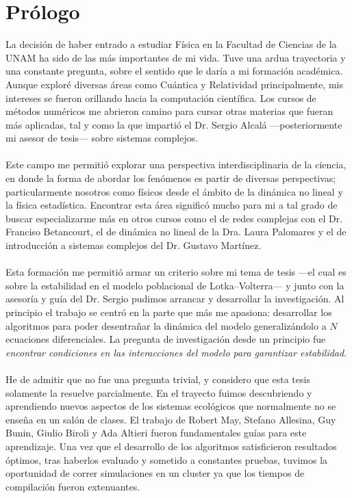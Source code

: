 \chapter{Prólogo}

\setlength{\parindent}{0cm} La decisión de haber entrado a estudiar Física en la Facultad de Ciencias de la UNAM ha sido de las más importantes de mi vida. Tuve una ardua trayectoria y una constante pregunta, sobre el sentido que le daría a mi formación académica. Aunque exploré diversas áreas como Cuántica y Relatividad principalmente, mis intereses se fueron orillando hacia la computación científica. Los cursos de métodos numéricos me abrieron camino para cursar otras materias que fueran más aplicadas, tal y como la que impartió el Dr. Sergio Alcalá ---posteriormente mi asesor de tesis--- sobre sistemas complejos.\\
\\
Este campo me permitió explorar una perspectiva interdisciplinaria de la ciencia, en donde la forma de abordar los fenómenos es partir de diversas perspectivas; particularmente nosotros como físicos desde el ámbito de la dinámica no lineal y la física estadística. Encontrar esta área significó mucho para mi a tal grado de buscar especializarme más en otros cursos como el de redes complejas con el Dr. Franciso Betancourt, el de dinámica no lineal de la Dra. Laura Palomares y el de introducción a sistemas complejos del Dr. Gustavo Martínez.\\
\\
Esta formación me permitió armar un criterio sobre mi tema de tesis ---el cual es sobre la estabilidad en el modelo poblacional de Lotka--Volterra--- y junto con la asesoría y guía del Dr. Sergio pudimos arrancar y desarrollar la investigación. Al principio el trabajo se centró en la parte que más me apasiona: desarrollar los algoritmos para poder desentrañar la dinámica del modelo generalizándolo a $N$ ecuaciones diferenciales. La pregunta de investigación desde un principio fue \textit{encontrar condiciones en las interacciones del modelo para garantizar estabilidad}.\\
\\
He de admitir que no fue una pregunta trivial, y considero que esta tesis solamente la resuelve parcialmente. En el trayecto fuimos descubriendo y aprendiendo nuevos aspectos de los sistemas ecológicos que normalmente no se enseña en un salón de clases. El trabajo de Robert May, Stefano Allesina, Guy Bunin, Giulio Biroli y Ada Altieri fueron fundamentales guías para este aprendizaje. Una vez que el desarrollo de los algoritmos satisficieron resultados óptimos, tras haberlos evaluado y sometido a constantes pruebas, tuvimos la oportunidad de correr simulaciones en un cluster ya que los tiempos de compilación fueron extenuantes.
